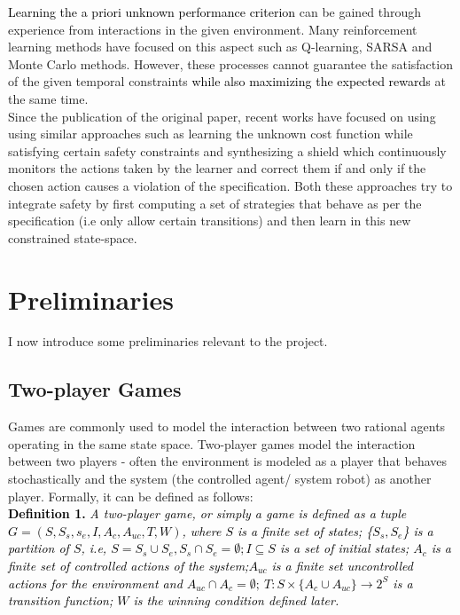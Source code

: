 \documentclass[letterpaper, 10 pt, conference]{ieeeconf}  %
\begin{document}
\textcolor{black}{Learning the a priori unknown performance criterion} can be gained through experience from interactions in the given environment. Many reinforcement learning methods\cite{c13} have focused on this aspect such as Q-learning, SARSA and Monte Carlo methods. However, these processes cannot guarantee the satisfaction of the given temporal constraints \textcolor{black} {while also maximizing the expected rewards} at the same time. \\

Since the publication of the original paper, recent works have focused on using using similar approaches such as learning the unknown cost function while satisfying certain safety constraints\cite{c14} and synthesizing a shield\cite{c15} which continuously monitors the actions taken by the learner and correct them if and only if the chosen action causes a violation of the specification. Both these approaches try to integrate safety by first computing a set of strategies that behave as per the specification (i.e only allow certain transitions) and then learn in this new constrained state-space.

\section{Preliminaries}

I now introduce some preliminaries relevant to the project.

\subsection{Two-player Games}

Games are commonly used to model the interaction between two rational agents operating in the same state space. Two-player games model the interaction between two players - often the environment is modeled as a player that behaves stochastically and the system (the controlled agent/ system robot) as another player. Formally, it can be defined as follows:\\

\textcolor{black}{ \textbf{Definition 1.} \textit{A two-player game, or simply a game is defined as a tuple $G = (S, S_s, s_e, I,A_c, A_{uc}, T, W)$, where $S$ is a finite set of states; \{$S_s, S_e$\} is a partition of $S$, i.e, $S = S_s \cup S_e, S_s \cap S_e = \emptyset; I \subseteq S$ is a set of initial states; $A_c$ is a finite set of controlled actions of the system;$A_{uc}$ is a finite set uncontrolled actions for the environment and $A_{uc} \cap A_c = \emptyset;\: T : S \times \{A_c \cup A_{uc}\} \rightarrow 2^S$ is a transition function; $W$ is the winning condition defined later.}}\\
\end{document}
